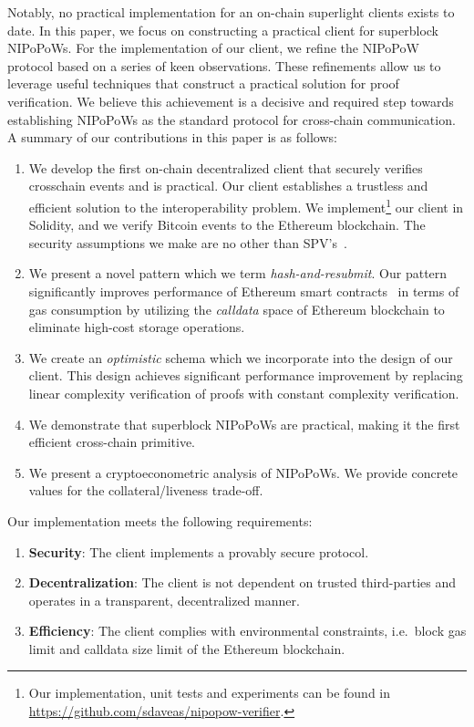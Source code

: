 Notably, no practical implementation for an on-chain superlight
clients exists to date. In this paper, we focus on constructing a practical
client for superblock NIPoPoWs.
For the implementation of our client, we refine the
NIPoPoW protocol based on a series of keen observations. These refinements
allow us to leverage useful techniques that construct a practical solution for
proof verification. We believe this achievement is a decisive and required step towards
establishing NIPoPoWs as the standard protocol for cross-chain communication.
A summary of our contributions in this paper is as follows:
\begin{enumerate}
\item We develop the first on-chain decentralized client that securely verifies
crosschain events and is practical. Our client establishes a trustless and
efficient solution to the interoperability problem. We implement\footnote{Our
implementation, unit tests and experiments can be found in
\url{https://github.com/sdaveas/nipopow-verifier}.} our client
in Solidity, and we verify Bitcoin events to the Ethereum blockchain. The
security assumptions we make are no other than
SPV's~\cite{eclipse, eclipse-ethereum}.
\item We present a novel pattern which we term \emph{hash-and-resubmit}. Our
pattern significantly improves performance of Ethereum smart
contracts~\cite{wood, buterin} in terms of gas consumption by utilizing the
\emph{calldata} space of Ethereum blockchain to eliminate high-cost storage
operations.
\item We create an \emph{optimistic} schema which we incorporate into the design
of our client. This design achieves significant performance improvement by
replacing linear complexity verification of proofs with constant complexity
verification.
\item We demonstrate that superblock NIPoPoWs are practical,
making it the first efficient cross-chain primitive.
\item We present a cryptoeconometric analysis of NIPoPoWs.
We provide concrete values for the collateral/liveness trade-off.
\end{enumerate}

Our implementation meets the following requirements:
\begin{enumerate}
\item \textbf{Security}: The client implements a provably secure protocol.
\item \textbf{Decentralization}: The client is not dependent on trusted third-parties
and operates in a transparent, decentralized manner.
\item \textbf{Efficiency}: The client complies with environmental constraints, i.e.\
block gas limit and calldata size limit of the Ethereum blockchain.
\end{enumerate}

